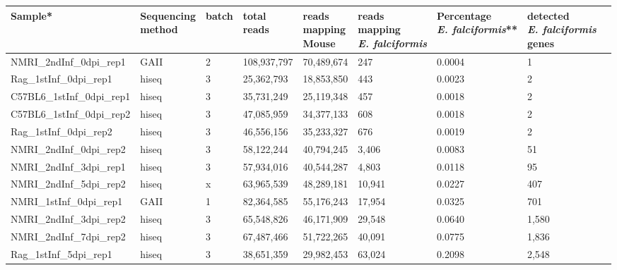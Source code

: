 \documentclass{bmcart}
\begin{document}
\begin{backmatter}

\begin{table}[ht]
\centering
\hspace*{-2.5cm}\begin{tabular}{lllllllll}
  \hline
Sample* & \bcell{Sequencing\\method} & batch & \bcell{total\\reads} & \bcell{reads\\mapping\\Mouse} & \bcell{reads\\mapping\\\textit{E. falciformis}} & \bcell{Percentage\\\textit{E. falciformis}}** & \bcell{detected\\ \textit{E. falciformis}\\genes} \\ 
  \hline
NMRI\_2ndInf\_0dpi\_rep1 & GAII & 2 & 108,937,797 & 70,489,674 & 247 & 0.0004 & 1 \\ 
  Rag\_1stInf\_0dpi\_rep1 & hiseq & 3 & 25,362,793 & 18,853,850 & 443 & 0.0023 & 2 \\ 
  C57BL6\_1stInf\_0dpi\_rep1 & hiseq & 3 & 35,731,249 & 25,119,348 & 457 & 0.0018 & 2 \\ 
  C57BL6\_1stInf\_0dpi\_rep2 & hiseq & 3 & 47,085,959 & 34,377,133 & 608 & 0.0018 & 2 \\ 
  Rag\_1stInf\_0dpi\_rep2 & hiseq & 3 & 46,556,156 & 35,233,327 & 676 & 0.0019 & 2 \\ 
  NMRI\_2ndInf\_0dpi\_rep2 & hiseq & 3 & 58,122,244 & 40,794,245 & 3,406 & 0.0083 & 51 \\ 
  \rowcolor{LightCyan}
  NMRI\_2ndInf\_3dpi\_rep1 & hiseq & 3 & 57,934,016 & 40,544,287 & 4,803 & 0.0118 & 95 \\ 
  \rowcolor{LightCyan}
  NMRI\_2ndInf\_5dpi\_rep2 & hiseq & x & 63,965,539 & 48,289,181 & 10,941 & 0.0227 & 407 \\ 
  \rowcolor{LightRed}
  NMRI\_1stInf\_0dpi\_rep1 & GAII & 1 & 82,364,585 & 55,176,243 & 17,954 & 0.0325 & 701 \\ 
  NMRI\_2ndInf\_3dpi\_rep2 & hiseq & 3 & 65,548,826 & 46,171,909 & 29,548 & 0.0640 & 1,580 \\ 
  NMRI\_2ndInf\_7dpi\_rep2 & hiseq & 3 & 67,487,466 & 51,722,265 & 40,091 & 0.0775 & 1,836 \\ 
  Rag\_1stInf\_5dpi\_rep1 & hiseq & 3 & 38,651,359 & 29,982,453 & 63,024 & 0.2098 & 2,548 \\ 

\end{tabular}
\end{table}
\end{backmatter}
\end{document}

